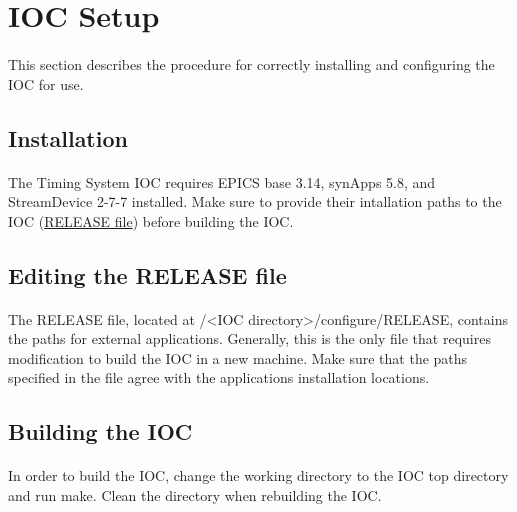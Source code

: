 \documentclass[openany]{article}
\begin{document}
\section{IOC Setup}

	\paragraph{} This section describes the procedure for correctly installing and configuring the IOC for use.

	\subsection{Installation}

		\paragraph{} The Timing System IOC requires EPICS base 3.14, synApps 5.8, and StreamDevice 2-7-7 installed. Make sure to provide their intallation paths to the IOC (\hyperref[sec:release-file]{RELEASE file}) before building the IOC.

	\subsection{Editing the RELEASE file}\label{sec:release-file}

		\paragraph{} The RELEASE file, located at /\textless IOC directory\textgreater/configure/RELEASE, contains the paths for external applications. Generally, this is the only file that requires modification to build the IOC in a new machine. Make sure that the paths specified in the file agree with the applications installation locations.

	\subsection{Building the IOC}

		\paragraph{} In order to build the IOC, change the working directory to the IOC top directory and run make. Clean the directory when rebuilding the IOC.
\end{document}
